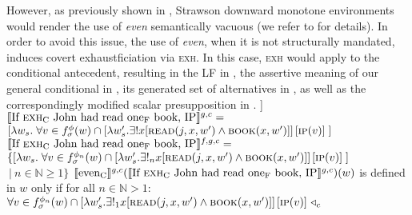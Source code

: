 However, as previously shown in , Strawson downward monotone environments would render the use of \textit{even} semantically vacuous (we refer to  for details). In order to avoid this issue, the use of \textit{even}, when it is not structurally mandated, induces covert exhaustficiation via {\scshape exh}. In this case, {\scshape exh} would apply to the conditional antecedent, resulting in the LF in , the assertive meaning of our general conditional in , its generated set of alternatives in , as well as the correspondingly modified scalar presupposition in .
\pex\label{ex:ds-neutral-conditional-exh}
\a[] [even\textsubscript{C} [If {\scshape exh}\textsubscript{C} John had read one\textsubscript{F} book, IP]]
\a $\intension[g,c]{If {\scshape exh}\textsubscript{C} John had read one\textsubscript{F} book, IP}=$\\$[\lambda w_s.\hspace{1mm}\forall v\in f^{\phi}_\sigma(w)\cap [\lambda w'_s.\exists!{x}[\predicate{read}(j,x,w')\land\predicate{book}(x,w')]]\hspace{0.5mm}[\predicate{ip}(v)]\hspace{1mm}]$
\a $\intension[f,g,c]{If {\scshape exh}\textsubscript{C} John had read one\textsubscript{F} book, IP}=$\\$\{[\lambda w_s.\hspace{1mm}\forall v\in f^{\phi_n}_\sigma(w)\cap [\lambda w'_s.\exists!_n{x}[\predicate{read}(j,x,w')\land\predicate{book}(x,w')]]\hspace{0.5mm}[\predicate{ip}(v)]\hspace{1mm}]$\\\emptyfill$~|~n\in\mathbb{N}\geqslant1\}$
\xe\vspace{-2\baselineskip}
\ex
$\intension[g,c]{even\textsubscript{C}}(\intension[g,c]{If {\scshape exh}\textsubscript{C} John had read one\textsubscript{F} book, IP})(w)$ is defined in $w$ only if for all $n\in\mathbb{N}>1$:\\
$\forall v\in f^{\phi_n}_\sigma(w)\cap [\lambda w'_s.\exists!_1{x}[\predicate{read}(j,x,w')\land\predicate{book}(x,w')]]\hspace{0.5mm}[\predicate{ip}(v)]~\lprob_c$\\\emptyfill
